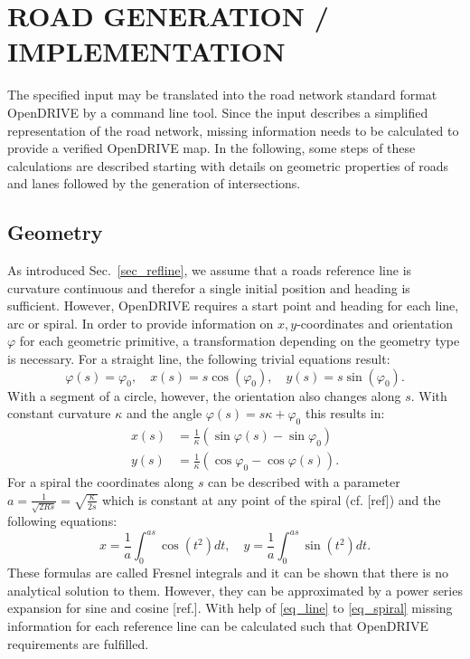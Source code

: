 \documentclass[a4paper, 10pt, conference]{ieeeconf}      %
\begin{document}
\section{ROAD GENERATION / IMPLEMENTATION}
The specified input may be translated into the road network standard format OpenDRIVE by a command line tool. Since the input describes a simplified representation of the road network, missing information needs to be calculated to provide a verified OpenDRIVE map. In the following, some steps of these calculations are described starting with details on geometric properties of roads and lanes followed by the generation of intersections. 
\subsection{Geometry}\label{sec_geometry}
	As introduced Sec.~\ref{sec_refline}, we assume that a roads reference line is curvature continuous and therefor a single initial position and heading is sufficient. However, OpenDRIVE requires a start point and heading for each line, arc or spiral. In order to provide information on $x,y$-coordinates and orientation $\varphi$ for each geometric primitive, a transformation depending on the geometry type is necessary. For a straight line, the following trivial equations result:
    \begin{equation}
        \varphi(s) = \varphi_0, \quad x(s) = s \cos(\varphi_0), \quad y(s) = s \sin(\varphi_0)\text{.}
        \label{eq_line}
    \end{equation}
    With a segment of a circle, however, the orientation also changes along $s$. With constant curvature $\kappa$ and the angle $\varphi(s) = s \kappa + \varphi_0$ this results in:
    \begin{equation}
    \begin{split}
        x(s) &= \frac{1}{\kappa} \left(\sin\varphi(s) - \sin\varphi_0 \right)\\
        y(s) &= \frac{1}{\kappa} \left(\cos\varphi_0 - \cos\varphi(s) \right) \text{.}
    \end{split}
    \label{eq_arc}
    \end{equation}
    For a spiral the coordinates along $s$ can be described with a parameter \(a = \frac{1}{\sqrt{2Rs}} = \sqrt{\frac{\kappa}{2s}}\) which is constant at any point of the spiral (cf. [ref]) and the following equations: 
    \begin{equation} 
        x = \frac{1}{a}\int_0^{as}  \cos\left(t^2\right)dt, \quad y = \frac{1}{a}\int_0^{as}  \sin\left(t^2\right)dt \text{.}
        \label{eq_spiral}
    \end{equation}
	These formulas are called Fresnel integrals and it can be shown that there is no analytical solution to them. However, they can be approximated by a power series expansion for sine and cosine [ref.]. With help of \ref{eq_line} to \ref{eq_spiral} missing information for each reference line can be calculated such that OpenDRIVE requirements are fulfilled.
\end{document}

